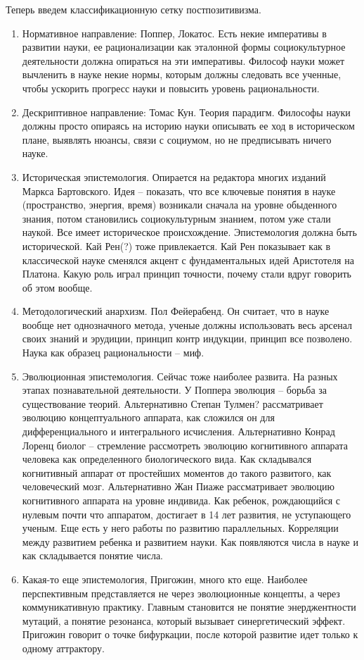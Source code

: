 \documentclass[a4paper, 12pt]{article}
\begin{document}
Теперь введем классификационную сетку постпозитивизма.
\begin{enumerate}
  \item Нормативное направление: Поппер, Локатос. Есть некие императивы 
    в развитии науки, ее рационализации как эталонной формы 
    социокультурное деятельности должна опираться на эти императивы. 
    Философ науки может вычленить в науке некие нормы, которым должны 
    следовать все ученные, чтобы ускорить прогресс науки и повысить 
    уровень рациональности.
  \item Дескриптивное направление: Томас Кун. Теория парадигм. Философы 
    науки должны просто опираясь на историю науки описывать ее ход 
    в историческом плане, выявлять нюансы, связи с социумом, но не 
    предписывать ничего науке.
  \item Историческая эпистемология. Опирается на редактора многих 
    изданий Маркса Бартовского. Идея -- показать, что все ключевые 
    понятия в науке (пространство, энергия, время) возникали сначала на 
    уровне обыденного знания, потом становились социокультурным знанием, 
    потом уже стали наукой. Все имеет историческое происхождение. 
    Эпистемология должна быть исторической. Кай Рен(?) тоже 
    привлекается. Кай Рен показывает как в классической науке сменялся 
    акцент с фундаментальных идей Аристотеля на Платона. Какую роль 
    играл принцип точности, почему стали вдруг говорить об этом вообще.
  \item Методологический анархизм. Пол Фейерабенд. Он считает, что 
    в науке вообще нет однозначного метода, ученые должны использовать 
    весь арсенал своих знаний и эрудиции, принцип контр индукции, 
    принцип все позволено. Наука как образец рациональности -- миф.
  \item Эволюционная эпистемология. Сейчас тоже наиболее развита. На 
    разных этапах познавательной деятельности. У Поппера эволюция -- 
    борьба за существование теорий. Альтернативно Степан Тулмен? 
    рассматривает эволюцию концептуального аппарата, как сложился он для 
    дифференциального и интегрального исчисления. Альтернативно Конрад 
    Лоренц биолог -- стремление рассмотреть эволюцию когнитивного 
    аппарата человека как определенного биологического вида. Как 
    складывался когнитивный аппарат от простейших моментов до такого 
    развитого, как человеческий мозг. Альтернативно Жан Пиаже 
    рассматривает эволюцию когнитивного аппарата на уровне индивида. Как 
    ребенок, рождающийся с нулевым почти что аппаратом, достигает в 14 
    лет развития, не уступающего ученым. Еще есть у него работы по 
    развитию параллельных. Корреляции между развитием ребенка 
    и развитием науки. Как появляются числа в науке и как складывается 
    понятие числа.
  \item Какая-то еще эпистемология, Пригожин, много кто еще. Наиболее 
    перспективным представляется не через эволюционные концепты, а через 
    коммуникативную практику. Главным становится не понятие 
    энерджентности мутаций, а понятие резонанса, который вызывает 
    синергетический эффект. Пригожин говорит о точке бифуркации, после 
    которой развитие идет только к одному аттрактору.
\end{enumerate}
\end{document}
